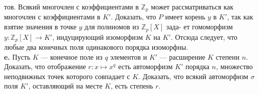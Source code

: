 \documentclass{mai_book}
\begin{document}
тов. Всякий многочлен с коэффициентами в $\mathbb{Z}_p$ может рассматриваться\linebreak
как многочлен с коэффициентами в $K'$. Доказать, что $P$ имеет корень\linebreak
$y$ в $K'$, так как взятие значения в точке $y$ для полиномов из $\mathbb{Z}_p[X]$ зада-\linebreak
ет гомоморфизм $y:\mathbb{Z}_p[X]\rightarrow K'$, индуцирующий изоморфизм $K$ на $K'$.\linebreak
Отсюда следует, что любые два конечных поля одинакового порядка\linebreak
изоморфны.
\\
\hspace*{10pt}\textbf{e.} Пусть $K$ — конечное поле из $q$ элементов и $K'$ — расширение $K$\linebreak
степени $n$. Доказать, что отображение $r:x\mapsto x^q$ есть автоморфизм\linebreak
$K'$ порядка $n$, множество неподвижных точек которого совпадает с $K$.\linebreak
Доказать, что всякий автоморфизм $\sigma$ поля $K'$, оставляющий на месте\linebreak
$K$, есть степень $r$.
\pagebreak

\end{document}
